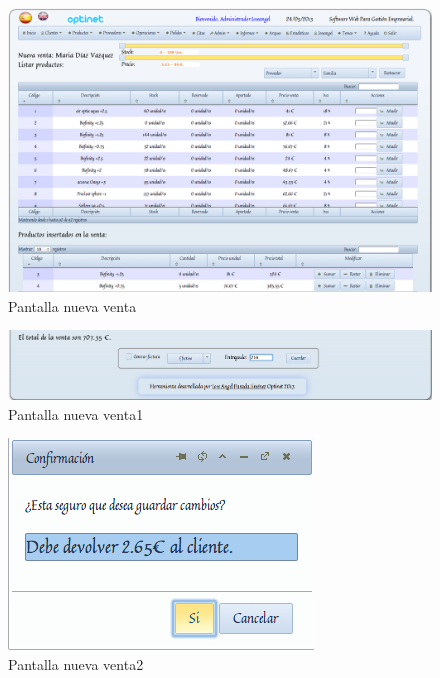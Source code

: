 \documentclass[a4paper,11pt]{book}
\begin{document}
\begin{figure}[!htb]
  \centering
    \includegraphics[scale=0.35]{capnuevaventa.png}
  \caption{Pantalla nueva venta}
  \label{a}
\end{figure}

\begin{figure}[!htb]
  \centering
    \includegraphics[scale=0.35]{capnuevaventa1.png}
  \caption{Pantalla nueva venta1}
  \label{a}
\end{figure}

\begin{figure}[!htb]
  \centering
    \includegraphics[scale=0.35]{capnuevaventa2.png}
  \caption{Pantalla nueva venta2}
  \label{a}
\end{figure}
\end{document}
